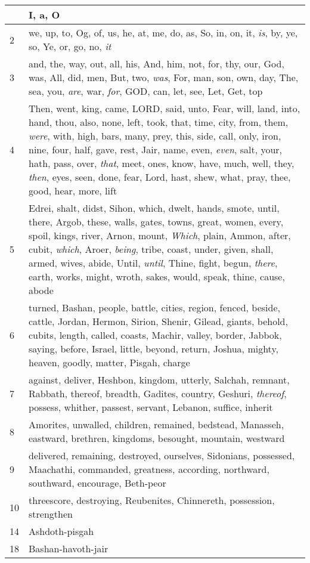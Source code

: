 \begin{longtable}{l|p{3.75in}}
\hline \hline
\endlastfoot
1 & I, a, O \\ \hline
2 & we, up, to, Og, of, us, he, at, me, do, as, So, in, on, it, \emph{is}, by, ye, so, Ye, or, go, no, \emph{it} \\ \hline
3 & and, the, way, out, all, his, And, him, not, for, thy, our, God, was, All, did, men, But, two, \emph{was}, For, man, son, own, day, The, sea, you, \emph{are}, war, \emph{for}, GOD, can, let, see, Let, Get, top \\ \hline
4 & Then, went, king, came, LORD, said, unto, Fear, will, land, into, hand, thou, also, none, left, took, that, time, city, from, them, \emph{were}, with, high, bars, many, prey, this, side, call, only, iron, nine, four, half, gave, rest, Jair, name, even, \emph{even}, salt, your, hath, pass, over, \emph{that}, meet, ones, know, have, much, well, they, \emph{then}, eyes, seen, done, fear, Lord, hast, shew, what, pray, thee, good, hear, more, lift \\ \hline
5 & Edrei, shalt, didst, Sihon, which, dwelt, hands, smote, until, there, Argob, these, walls, gates, towns, great, women, every, spoil, kings, river, Arnon, mount, \emph{Which}, plain, Ammon, after, cubit, \emph{which}, Aroer, \emph{being}, tribe, coast, under, given, shall, armed, wives, abide, Until, \emph{until}, Thine, fight, begun, \emph{there}, earth, works, might, wroth, sakes, would, speak, thine, cause, abode \\ \hline
6 & turned, Bashan, people, battle, cities, region, fenced, beside, cattle, Jordan, Hermon, Sirion, Shenir, Gilead, giants, behold, cubits, length, called, coasts, Machir, valley, border, Jabbok, saying, before, Israel, little, beyond, return, Joshua, mighty, heaven, goodly, matter, Pisgah, charge \\ \hline
7 & against, deliver, Heshbon, kingdom, utterly, Salchah, remnant, Rabbath, thereof, breadth, Gadites, country, Geshuri, \emph{thereof}, possess, whither, passest, servant, Lebanon, suffice, inherit \\ \hline
8 & Amorites, unwalled, children, remained, bedstead, Manasseh, eastward, brethren, kingdoms, besought, mountain, westward \\ \hline
9 & delivered, remaining, destroyed, ourselves, Sidonians, possessed, Maachathi, commanded, greatness, according, northward, southward, encourage, Beth-peor \\ \hline
10 & threescore, destroying, Reubenites, Chinnereth, possession, strengthen \\ \hline
14 & Ashdoth-pisgah \\ \hline
18 & Bashan-havoth-jair \\ \hline
\end{longtable}






